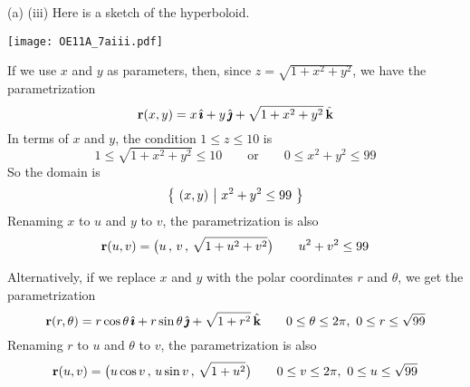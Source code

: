 \begin{solution}
\goodbreak
(a) (iii) Here is a sketch of the hyperboloid.
\begin{center}
    \texttt{[image: OE11A\_7aiii.pdf]}
\end{center}
If we use $x$ and $y$ as parameters, then, since 
$z = \sqrt{1 + x^2 + y^2}$, we have the parametrization 
\begin{equation*}
\mathbf{r}(x,y) = x\,\hat{\pmb{\imath}} +y\,\hat{\pmb{\jmath}} +\sqrt{1 + x^2 + y^2}\,\hat{\mathbf{k}}
\end{equation*}
In terms of $x$ and $y$, the condition $1\le z\le 10$ is 
\begin{equation*}
1\le \sqrt{1 + x^2 + y^2}\le 10\qquad \text{or}\qquad 0\le x^2+y^2\le 99
\end{equation*}
So the domain is
\begin{equation*}
\big\{ \ (x,y)\ \big|\ x^2+y^2\le 99\ \big\}
\end{equation*}
Renaming $x$ to $u$ and $y$ to $v$, the parametrization is also
\begin{equation*}
\mathbf{r}(u,v) = \big(u\,,\, v\,,\, \sqrt{1 + u^2 + v^2}\big)\qquad
u^2+v^2\le 99
\end{equation*}

Alternatively, if we replace $x$ and $y$ with the polar coordinates
$r$ and $\theta$, we get the parametrization
\begin{equation*}
\mathbf{r}(r,\theta) = r\cos\theta\,\hat{\pmb{\imath}} +r\sin\theta\,\hat{\pmb{\jmath}} +\sqrt{1 + r^2}\,\hat{\mathbf{k}}
\qquad 0\le\theta\le 2\pi,\ 0\le r\le\sqrt{99}
\end{equation*}
Renaming $r$ to $u$ and $\theta$ to $v$, the parametrization is also
\begin{equation*}
\mathbf{r}(u,v) = \big(u\cos v\,,\, u\sin v\,,\, \sqrt{1 + u^2}\big)\qquad
0\le v\le 2\pi,\ 0\le u\le\sqrt{99}
\end{equation*}



\end{solution}
